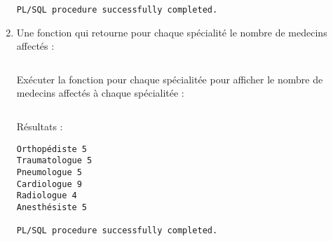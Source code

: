 \documentclass[12pt,a4paper]{article}
\begin{document}
\begin{enumerate}
\begin{oframed}
\begin{verbatim}
PL/SQL procedure successfully completed.
        \end{verbatim}
    \end{oframed}
    \item Une fonction qui retourne pour chaque spécialité le nombre de medecins affectés :
    \inputminted[firstline=53, lastline=59]{SQL}{../Scripts/TP4.sql}
    Exécuter la fonction pour chaque spécialitée pour afficher le nombre de medecins affectés à chaque spécialitée :
    \inputminted[firstline=61, lastline=68]{SQL}{../Scripts/TP4.sql}
    Résultats :
    \begin{oframed}
        \begin{verbatim}
Orthopédiste 5
Traumatologue 5
Pneumologue 5
Cardiologue 9
Radiologue 4
Anesthésiste 5

PL/SQL procedure successfully completed.
        \end{verbatim}
    \end{oframed}
    \end{enumerate}
\end{document}
